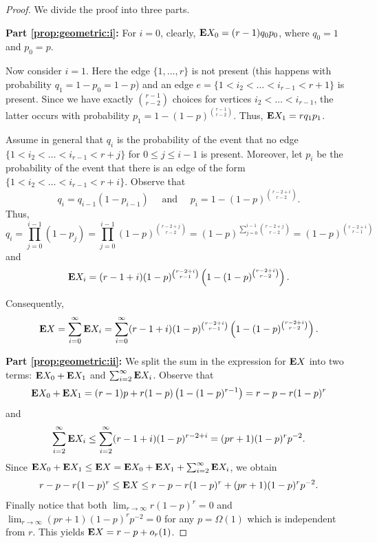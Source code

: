 \documentclass[12pt,reqno]{amsart}
\theoremstyle{remark}
\def\E{\mbox{{\bf E}}}
\def\E{\mbox{{\bf E}}}
\begin{document}
\begin{proof}
We divide the proof into three parts.

\medskip
\textbf{Part \eqref{prop:geometric:i}:}
For $i=0$, clearly, $\E X_0 = (r-1)q_0p_0$, where $q_0=1$ and $p_0=p$. 

Now consider $i=1$. Here the edge $\{1,\dots,r\}$ is not present (this happens with probability $q_1 =1-p_0=1-p$) and an edge $e=\{1<i_2<\dots<i_{r-1}<r+1\}$ is present. Since we have exactly $\binom{r-1}{r-2}$ choices for vertices $i_2<\dots<i_{r-1}$, the latter occurs with probability $p_1=1-\left(1-p\right)^{\binom{r-1}{r-2}}$. Thus, $\E X_{1} = r q_1 p_1$.

Assume in general that $q_i$ is the probability of the event that no edge $\{1<i_2<\dots<i_{r-1}<r+j\}$ for $0\le j\le i-1$ is present. Moreover, let $p_i$ be the probability of the event that there is an edge of the form $\{1<i_2<\dots<i_{r-1}<r+i\}$. Observe that 
\[
q_i = q_{i-1}(1-p_{i-1}) \quad\text{ and }\quad p_i=1-\left(1-p \right)^{\binom{r-2+i}{r-2}}.
\]
Thus,
\[
q_i = \prod_{j=0}^{i-1} (1-p_j)
= \prod_{j=0}^{i-1} \left(1-p \right)^{\binom{r-2+j}{r-2}}
= (1-p)^{\sum_{j=0}^{i-1} \binom{r-2+j}{r-2}}
= (1-p)^{\binom{r-2+i}{r-1}}
\]
and
\[
\E X_i = (r-1+i) (1-p)^{\binom{r-2+i}{r-1}} \left( 1-\left(1-p \right)^{\binom{r-2+i}{r-2}} \right). 
\]

Consequently,
\[
\E X=\sum_{i=0}^\infty \E X_i = \sum_{i=0}^\infty (r-1+i) (1-p)^{\binom{r-2+i}{r-1}} \left( 1-\left(1-p \right)^{\binom{r-2+i}{r-2}} \right).
\]

\medskip
\textbf{Part \eqref{prop:geometric:ii}:}
We split the sum in the expression for $\E X$ into two terms: $\E X_0+\E X_1$ and $\sum_{i=2}^\infty \E X_i$. Observe that 
\[
\E X_0 + \E X_1 = (r-1)p + r(1-p)\left(1-(1-p)^{r-1}\right) = r -p - r(1-p)^r
\]
and
\[
\sum_{i=2}^\infty \E X_i \le \sum_{i=2}^\infty (r-1+i) (1-p)^{r-2+i} = (pr+1)(1-p)^rp^{-2}.
\]
Since $\E X_0 + \E X_1 \le \E X = \E X_0 + \E X_1 + \sum_{i=2}^\infty \E X_i$, we obtain
\[
r -p - r(1-p)^r \le \E X \le  r -p - r(1-p)^r+ (pr+1)(1-p)^rp^{-2}.
\]
Finally notice that both $\lim_{r\to\infty} r(1-p)^r = 0$ and $\lim_{r\to\infty} (pr+1)(1-p)^rp^{-2} = 0$ for any $p=\Omega(1)$ which is independent from $r$.
This yields $\E X = r-p+o_r(1)$.



\end{proof}
\end{document}
